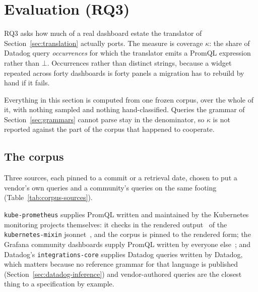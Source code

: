 \section{Evaluation (RQ3)}
\label{sec:evaluation}

RQ3 asks how much of a real dashboard estate the translator of
Section~\ref{sec:translation} actually ports. The measure is coverage $\kappa$: the share
of Datadog query \emph{occurrences} for which the translator emits a PromQL expression
rather than $\bot$. Occurrences rather than distinct strings, because a widget repeated
across forty dashboards is forty panels a migration has to rebuild by hand if it fails.

Everything in this section is computed from one frozen corpus, over the whole of it, with
nothing sampled and nothing hand-classified. Queries the grammar of
Section~\ref{sec:grammars} cannot parse stay in the denominator, so $\kappa$ is not
reported against the part of the corpus that happened to cooperate.

\subsection{The corpus}
\label{sec:corpus}

Three sources, each pinned to a commit or a retrieval date, chosen to put a vendor's own
queries and a community's queries on the same footing
(Table~\ref{tab:corpus-sources}).

\begin{table}[htbp]\centering\scriptsize

\caption{Corpus sources. Queries are extracted from dashboard and alerting definitions,
not written for this paper. The Datadog figure counts metric queries; the same documents
also contribute $6{,}022$ formula expressions, held aside .}
\label{tab:corpus-sources}
\end{table}

\texttt{kube-prometheus} supplies PromQL written and maintained by the Kubernetes
monitoring projects themselves: it checks in the rendered output~\citep{kubeprom} of
the \texttt{kubernetes-mixin} jsonnet~\citep{kubemixin}, and the corpus is pinned to
the rendered form; the Grafana community dashboards supply PromQL written by
everyone else~\citep{grafanadash}; and Datadog's \texttt{integrations-core} supplies
Datadog queries written by Datadog, which matters because no reference grammar for that
language is published (Section~\ref{sec:datadog-inference}) and vendor-authored queries
are the closest thing to a specification by example.

